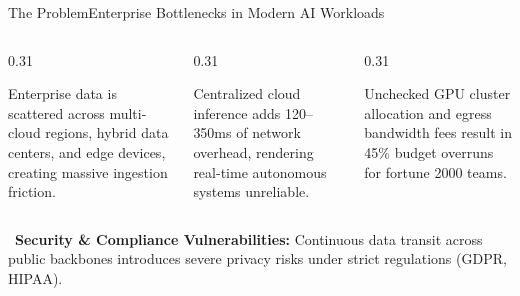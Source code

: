 \documentclass[aspectratio=169,10pt]{beamer}
\begin{document}
\begin{frame}{The Problem}{Enterprise Bottlenecks in Modern AI Workloads}
  \vspace*{-0.1cm}
  \begin{columns}[T]
    \begin{column}{0.31\textwidth}
      \begin{tcolorbox}[darkcard, title={\color{neonpurple}\faDatabase\ Data Silos}]
        \scriptsize
        Enterprise data is scattered across multi-cloud regions, hybrid data centers, and edge devices, creating massive ingestion friction.
      \end{tcolorbox}
    \end{column}
    
    \begin{column}{0.31\textwidth}
      \begin{tcolorbox}[darkcard, title={\color{neoncyan}\faBolt\ High Latency}]
        \scriptsize
        Centralized cloud inference adds 120--350ms of network overhead, rendering real-time autonomous systems unreliable.
      \end{tcolorbox}
    \end{column}
    
    \begin{column}{0.31\textwidth}
      \begin{tcolorbox}[darkcard, title={\color{emeralds}\faDollarSign\ Escalating Costs}]
        \scriptsize
        Unchecked GPU cluster allocation and egress bandwidth fees result in 45\% budget overruns for fortune 2000 teams.
      \end{tcolorbox}
    \end{column}
  \end{columns}

  \vspace*{0.2cm}
  \begin{tcolorbox}[purplecard]
    \small \faLock\ \textbf{Security \& Compliance Vulnerabilities:} Continuous data transit across public backbones introduces severe privacy risks under strict regulations (GDPR, HIPAA).
  \end{tcolorbox}
\end{frame}
\end{document}
